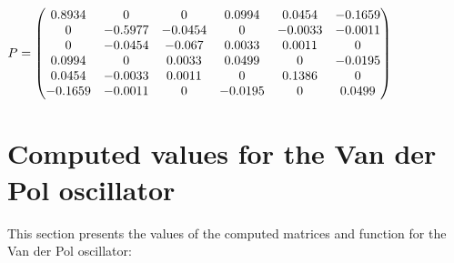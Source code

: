 \documentclass[fleqn]{article}
\begin{document}
$
P = \pmqty{ 0.8934 & 0 & 0 & 0.0994 & 0.0454 & -0.1659 \\ 0 & -0.5977 & -0.0454 & 0 & -0.0033 & -0.0011 \\ 0 & -0.0454 & -0.067 & 0.0033 & 0.0011 & 0 \\ 0.0994 & 0 & 0.0033 & 0.0499 & 0 & -0.0195 \\ 0.0454 & -0.0033 & 0.0011 & 0 & 0.1386 & 0 \\ -0.1659 & -0.0011 & 0 & -0.0195 & 0 & 0.0499 }
$

\section{Computed values for the Van der Pol oscillator}
This section presents the values of the computed matrices and function for the Van der Pol oscillator:
\end{document}
